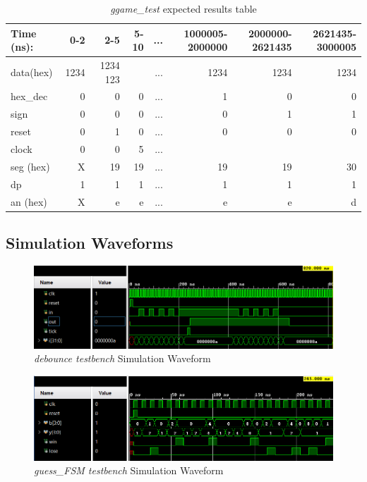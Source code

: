 \documentclass[11pt]{article}
\begin{document}
\begin{table}[ht]\centering
	\caption{\textit{ggame\_test} expected results table}
	\label{ALU:tbl:alu_ERT}\medskip
	\begin{tabular}{l|rrrrrrr}
		Time (ns): & 0-2 & 2-5 & 5-10 & ... & 1000005-2000000 & 2000000-2621435 & 2621435-3000005\\
		\midrule
		data(hex) & 1234 & 1234 123 && ... & 1234  & 1234 & 1234  \\
		hex\_dec & 0 & 0 & 0 & ... & 1 &  0 & 0\\
		sign & 0 & 0 & 0 & ... & 0 &  1 & 1 \\
		reset & 0 & 1 & 0 & ... & 0 & 0 & 0  \\
		clock & 0 & 0 & 5 & ...  \\
		\midrule
		seg (hex) & X & 19 & 19 & ... & 19 & 19 & 30 \\
		dp & 1 & 1 & 1 & ... & 1 & 1 & 1 \\
		an (hex)& X & e & e & ... & e & e & d \\
		\bottomrule
	\end{tabular}
\end{table}

\clearpage
 
\subsection*{Simulation Waveforms}
\begin{figure}[ht]\centering
	\includegraphics[width=1.1\textwidth]{debouncetest}
	\caption{\textit{debounce testbench} Simulation Waveform}
	\label{fig:sim_with_table}
\end{figure}

\begin{figure}[ht]\centering
	\includegraphics[width=1.1\textwidth]{gsfmtest}
	\caption{\textit{guess\_FSM testbench} Simulation Waveform}
	\label{fig:sim_with_table}
\end{figure}
\end{document}

